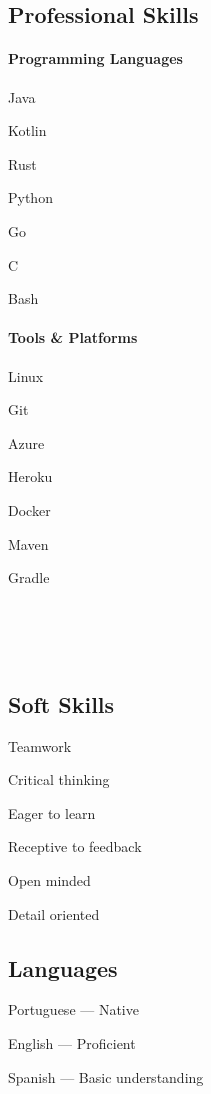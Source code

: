 \documentclass{article}
\begin{document}
\subsection*{Professional Skills}
\begin{minipage}[t]{.5\textwidth}
    \paragraph{Programming Languages}
    \begin{compactitem}
        \item Java
        \item Kotlin
        \item Rust
        \item Python
        \item Go
        \item C
        \item Bash
    \end{compactitem}
\end{minipage}
\begin{minipage}[t]{.5\textwidth}
    \paragraph{Tools \& Platforms}
    \begin{compactitem}
        \item Linux
        \item Git
        \item Azure
        \item Heroku
        \item Docker
        \item Maven
        \item Gradle
    \end{compactitem}
\end{minipage}
\\
\\
\\
\begin{minipage}[t]{.5\textwidth}
    \subsection*{Soft Skills}
    \begin{compactitem}
        \item Teamwork
        \item Critical thinking
        \item Eager to learn
        \item Receptive to feedback
        \item Open minded
        \item Detail oriented
    \end{compactitem}
\end{minipage}
\begin{minipage}[t]{.5\textwidth}
    \subsection*{Languages}
    \begin{compactitem}
        \item Portuguese --- Native
        \item English --- Proficient
        \item Spanish --- Basic understanding
    \end{compactitem}
\end{minipage}
\end{document}
